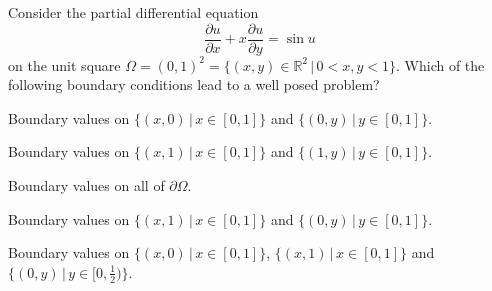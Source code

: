 Consider the partial differential equation
\[
\frac{\partial u}{\partial x}
+x
\frac{\partial u}{\partial y}
=
\sin u
\]
on the unit square
$\Omega=(0,1)^2=\{(x,y)\in\mathbb R^2\,|\, 0<x,y<1\}$.
Which of the following boundary conditions lead to a well posed
problem?
\begin{teilaufgaben}
\item
Boundary values on $\{(x,0)\,|\,x\in [0,1]\}$ and $\{(0,y)\,|\,y\in[0,1]\}$.
\item
Boundary values on $\{(x,1)\,|\,x\in [0,1]\}$ and $\{(1,y)\,|\,y\in[0,1]\}$.
\item
Boundary values on all of $\partial\Omega$.
\item
Boundary values on $\{(x,1)\,|\,x\in [0,1]\}$ and $\{(0,y)\,|\,y\in[0,1]\}$.
\item
Boundary values on
$\{(x,0)\,|\,x\in [0,1]\}$,
$\{(x,1)\,|\,x\in [0,1]\}$ and 
$\{(0,y)\,|\,y\in[0,\frac12)\}$.
\end{teilaufgaben}

